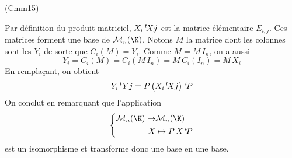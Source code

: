 \begin{tiny}(Cmm15)\end{tiny} Par définition du produit matriciel, $X_i\,\mathstrut^t\!Xj$ est la matrice élémentaire $E_{i,j}$. Ces matrices forment une base de $\mathcal{M}_{n}(\K)$.\newline
Notons $M$ la matrice dont les colonnes sont les $Y_i$ de sorte que $C_i(M)=Y_i$. Comme $M=M\,I_n$, on a aussi 
\begin{displaymath}
 Y_i = C_i(M) = C_i(M\,I_n)=M\,C_i(I_n)= M\,X_i
\end{displaymath}
En remplaçant, on obtient
\begin{displaymath}
 Y_i\,\mathstrut^t Yj = P \left( X_i\,\mathstrut^t\!Xj\right)\,\mathstrut^t\!P
\end{displaymath}
On conclut en remarquant que l'application
\begin{displaymath}
 \left\lbrace 
\begin{aligned}
 \mathcal{M}_{n}(\K) \rightarrow &\mathcal{M}_{n}(\K) \\
 X &\mapsto P\, X \,\mathstrut^t\!P
\end{aligned}
\right. 
\end{displaymath}
est un isomorphisme et transforme donc une base en une base.